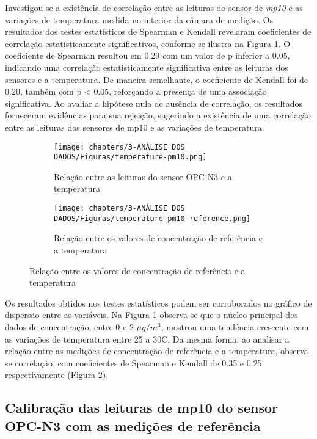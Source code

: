 Investigou-se a existência de correlação entre as leituras do sensor de \textit{mp10} e as variações de temperatura medida no interior da câmara de medição. Os resultados dos testes estatísticos de Spearman e Kendall revelaram coeficientes de correlação estatisticamente significativos, conforme se ilustra na Figura \ref{fig:data-temp-pm10-corr}. O coeficiente de Spearman resultou em 0.29 com um valor de p inferior a 0.05, indicando uma correlação estatisticamente significativa entre as leituras dos sensores e a temperatura. De maneira semelhante, o coeficiente de Kendall foi de 0.20, também com p < 0.05, reforçando a presença de uma associação significativa. Ao avaliar a hipótese nula de ausência de correlação, os resultados forneceram evidências para sua rejeição, sugerindo a existência de uma correlação entre as leituras dos sensores de \acrshort{mp10} e as variações de temperatura.

\begin{figure}[h]
    \centering
    \caption{Relação dos dados de concentração de \acrshort{mp10} com a temperatura}
    \begin{subfigure}{0.4\textwidth}
        \texttt{[image: chapters/3-ANÁLISE DOS DADOS/Figuras/temperature-pm10.png]}
        \caption{Relação entre as leituras do sensor OPC-N3 e a temperatura}
        \label{fig:data-temp-pm10-corr}
    \end{subfigure}
    \hfill
    \begin{subfigure}{0.4\textwidth}
        \texttt{[image: chapters/3-ANÁLISE DOS DADOS/Figuras/temperature-pm10-reference.png]}
        \caption{Relação entre os valores de concentração de referência e a temperatura}
        \label{fig:data-temp-pm10-ref-corr}
    \end{subfigure}
    \hfill
    \label{fig:data-pm10-temp}
\end{figure}

Os resultados obtidos nos testes estatísticos podem ser corroborados no gráfico de dispersão entre as variáveis. Na Figura \ref{fig:data-temp-pm10-corr} observa-se que o núcleo principal dos dados de concentração, entre 0 e 2 \(\mu g/m^3\), mostrou uma tendência crescente com as variações de temperatura entre 25 a 30\textdegree C. Da mesma forma, ao analisar a relação entre as medições de concentração de referência e a temperatura, observa-se correlação, com coeficientes de Spearman e Kendall de 0.35 e 0.25 respectivamente (Figura \ref{fig:data-temp-pm10-ref-corr}).

\subsection{Calibração das leituras de \acrshort{mp10} do sensor OPC-N3 com as medições de referência}

